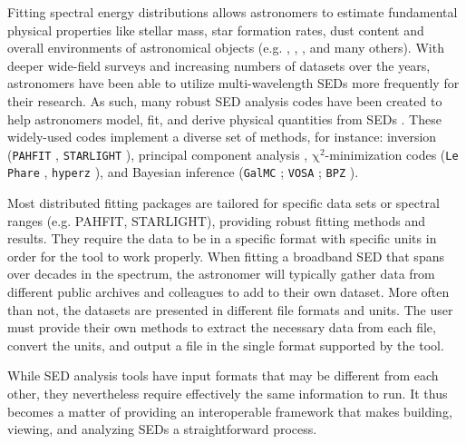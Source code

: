 \documentclass[5p]{elsarticle}
\begin{document}
Fitting spectral energy distributions allows astronomers to estimate fundamental physical properties like stellar mass, star formation rates, dust content and overall environments of astronomical objects (e.g. \citep{1998AJ....115.1329S}, \citep{2001ApJS..137..139S}, \citep{2007ApJS..169..328R}, and many others). With deeper wide-field surveys and increasing numbers of datasets over the years, astronomers have been able to utilize multi-wavelength SEDs more frequently for their research. As such, many robust SED analysis codes have been created to help astronomers model, fit, and derive physical quantities from SEDs \citep{2011Ap&SS.331....1W,2013ARA&A..51..393C}. These widely-used codes implement a diverse set of methods, for instance: inversion (\texttt{PAHFIT} \citep{2007ApJ...656..770S}, \texttt{STARLIGHT} \cite{2004MNRAS.355..273C}), principal component analysis \citep{2009MNRAS.394.1496B}, $\mathrm{\chi}^{2}$-minimization codes (\texttt{Le Phare} \citep{1999MNRAS.310..540A}, \texttt{hyperz} \citep{2000A&A...363..476B}), and Bayesian inference (\texttt{GalMC} \citep{2011ApJ...737...47A}; \texttt{VOSA} \citep{2008A&A...492..277B}; \texttt{BPZ} \citep{2000ApJ...536..571B}).

Most distributed fitting packages are tailored for specific data sets or spectral ranges (e.g. PAHFIT, STARLIGHT), providing robust fitting methods and results. They require the data to be in a specific format with specific units in order for the tool to work properly. When fitting a broadband SED that spans over decades in the spectrum, the astronomer will typically gather data from different public archives and colleagues to add to their own dataset. More often than not, the datasets are presented in different file formats and units. The user must provide their own methods to extract the necessary data from each file, convert the units, and output a file in the single format supported by the tool. 


While SED analysis tools have input formats that may be different from each other, they nevertheless require effectively the same information to run. It thus becomes a matter of providing an interoperable framework that makes building, viewing, and analyzing SEDs a straightforward process.

\end{document}
